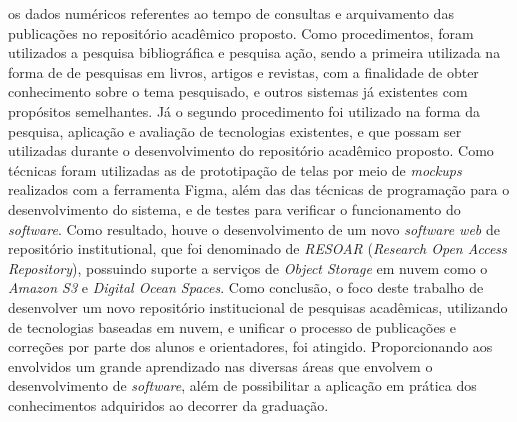 \documentclass[diss]{template/setrem}
\begin{document}
\begin{resumo}
    os dados numéricos referentes ao tempo de consultas e arquivamento das publicações no
    repositório acadêmico proposto.
    Como procedimentos, foram utilizados a pesquisa
    bibliográfica e pesquisa ação, sendo a primeira utilizada na forma de de pesquisas
    em livros, artigos e revistas, com a finalidade de obter conhecimento sobre o
    tema pesquisado, e outros sistemas já existentes com propósitos semelhantes. Já o
    segundo procedimento foi utilizado na forma da pesquisa, aplicação e avaliação de
    tecnologias existentes, e que possam ser utilizadas durante o desenvolvimento do
    repositório acadêmico proposto.
    Como técnicas foram utilizadas as de prototipação
    de telas por meio de \emph{mockups} realizados com a ferramenta Figma, além das
    das técnicas de programação para o desenvolvimento do sistema, e de testes para
    verificar o funcionamento do \emph{software}.
    Como resultado, houve o desenvolvimento de um novo \emph{software web} de
    repositório institutional, que foi denominado de \emph{RESOAR} (\emph{Research Open Access Repository}),
    possuindo suporte a serviços de \emph{Object Storage} em nuvem como o \emph{Amazon S3} e \emph{Digital Ocean Spaces}.
    Como conclusão, o foco deste trabalho de desenvolver um novo repositório institucional
    de pesquisas acadêmicas, utilizando de tecnologias baseadas em nuvem, e unificar o
    processo de publicações e correções por parte dos alunos e orientadores, foi atingido.
    Proporcionando aos envolvidos um grande aprendizado nas diversas áreas que envolvem
    o desenvolvimento de \emph{software}, além de possibilitar a aplicação em prática dos
    conhecimentos adquiridos ao decorrer da graduação.

\end{resumo}
\end{document}
